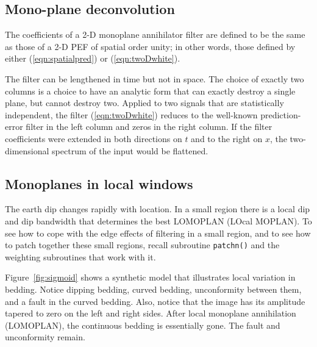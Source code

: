 \par\noindent
{}

\subsection{Mono-plane deconvolution}
The coefficients of a 2-D monoplane annihilator filter
are defined to be the same as those of a 2-D PEF
of spatial order unity; in other words,
those defined by either (\ref{eqn:spatialpred}) or (\ref{eqn:twoDwhite}).

The filter can be lengthened in time but not in space.
The choice of exactly two columns is a choice
to have an analytic form that can exactly destroy
a single plane, but cannot destroy two.
Applied to two signals that are statistically independent,
the filter (\ref{eqn:twoDwhite})
reduces to the well-known prediction-error filter
in the left column and zeros in the right column.
If the filter coefficients were extended
in both directions on $t$ and to the right on $x$,
the two-dimensional spectrum of the input would be flattened.

\subsection{Monoplanes in local windows}
The earth dip changes rapidly with location.
In a small region there is a local dip and dip bandwidth
that determines the best LOMOPLAN (LOcal MOPLAN).
To see how to cope with the edge effects of filtering
in a small region,
and to see how to patch together these small regions,
recall subroutine \texttt{patchn()}  
and the weighting subroutines that work with it.

\par
Figure~\ref{fig:sigmoid} shows a synthetic model
that illustrates local variation in bedding.
Notice dipping bedding, curved bedding, unconformity between them,
and a fault in the curved bedding.
Also, notice that the image has its amplitude tapered
to zero on the left and right sides.
After local monoplane annihilation (LOMOPLAN),
the continuous bedding is essentially gone.
The fault and unconformity remain.


